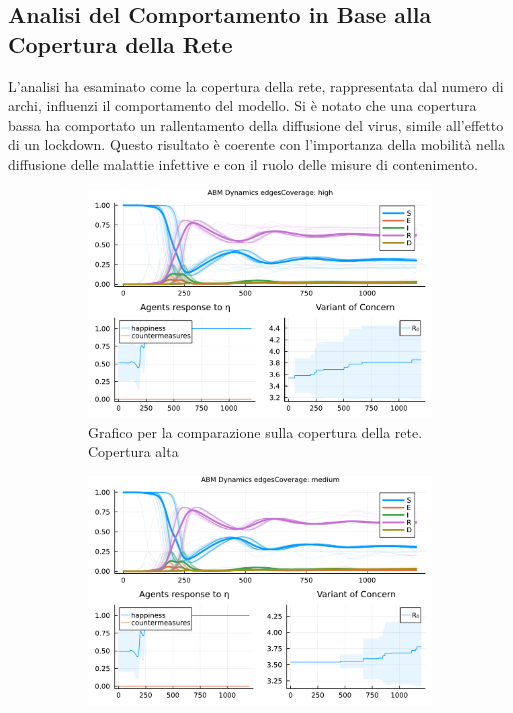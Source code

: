 \subsection{Analisi del Comportamento in Base alla Copertura della Rete}

L'analisi ha esaminato come la copertura della rete, rappresentata 
dal numero di archi, influenzi il comportamento del modello. 
Si è notato che una copertura bassa ha comportato un rallentamento 
della diffusione del virus, simile all'effetto di un lockdown. 
Questo risultato è coerente con l'importanza della mobilità nella 
diffusione delle malattie infettive e con il ruolo delle misure di 
contenimento.

\begin{figure}[!hb]
	\centering
	\begin{subfigure}[b]{0.3\textwidth}
		\centering
		\includegraphics[width=\textwidth]{img/SocialNetworkABM_1_EC.pdf}
		\caption{Grafico per la comparazione sulla copertura della rete. Copertura alta}
		\label{fig:comparison_highCoverage}
	\end{subfigure}
	\hfill
	\begin{subfigure}[b]{0.3\textwidth}
		\centering
		\includegraphics[width=\textwidth]{img/SocialNetworkABM_2_EC.pdf}

\end{subfigure}
\end{figure}
